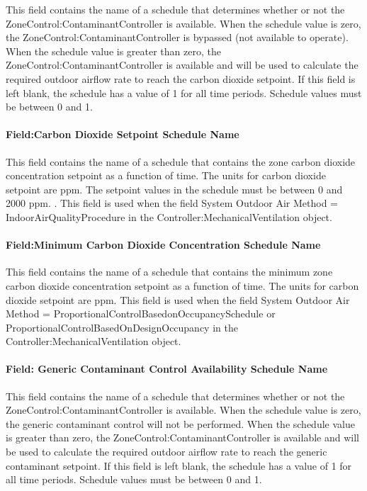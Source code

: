 This field contains the name of a schedule that determines whether or not the ZoneControl:ContaminantController is available. When the schedule value is zero, the ZoneControl:ContaminantController is bypassed (not available to operate). When the schedule value is greater than zero, the ZoneControl:ContaminantController is available and will be used to calculate the required outdoor airflow rate to reach the carbon dioxide setpoint. If this field is left blank, the schedule has a value of 1 for all time periods. Schedule values must be between 0 and 1.

\paragraph{Field:Carbon Dioxide Setpoint Schedule Name}\label{fieldcarbon-dioxide-setpoint-schedule-name}

This field contains the name of a schedule that contains the zone carbon dioxide concentration setpoint as a function of time. The units for carbon dioxide setpoint are ppm. The setpoint values in the schedule must be between 0 and 2000 ppm. . This field is used when the field System Outdoor Air Method = IndoorAirQualityProcedure in the Controller:MechanicalVentilation object.

\paragraph{Field:Minimum Carbon Dioxide Concentration Schedule Name}\label{fieldminimum-carbon-dioxide-concentration-schedule-name}

This field contains the name of a schedule that contains the minimum zone carbon dioxide concentration setpoint as a function of time. The units for carbon dioxide setpoint are ppm. This field is used when the field System Outdoor Air Method = ProportionalControlBasedonOccupancySchedule or ProportionalControlBasedOnDesignOccupancy in the Controller:MechanicalVentilation object.

\paragraph{Field: Generic Contaminant Control Availability Schedule Name}\label{field-generic-contaminant-control-availability-schedule-name}

This field contains the name of a schedule that determines whether or not the ZoneControl:ContaminantController is available. When the schedule value is zero, the generic contaminant control will not be performed. When the schedule value is greater than zero, the ZoneControl:ContaminantController is available and will be used to calculate the required outdoor airflow rate to reach the generic contaminant setpoint. If this field is left blank, the schedule has a value of 1 for all time periods. Schedule values must be between 0 and 1.

